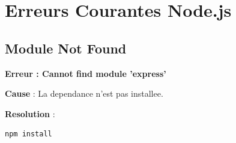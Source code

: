 \documentclass[a4paper,12pt]{book}
\begin{document}




\section{Erreurs Courantes Node.js}

\subsection{Module Not Found}

\begin{errorbox}
    \textbf{Erreur : Cannot find module 'express'}

    \textbf{Cause} : La dependance n'est pas installee.

    \textbf{Resolution} :
    \begin{lstlisting}[style=bash]
npm install
    \end{lstlisting}
\end{errorbox}



\end{document}
